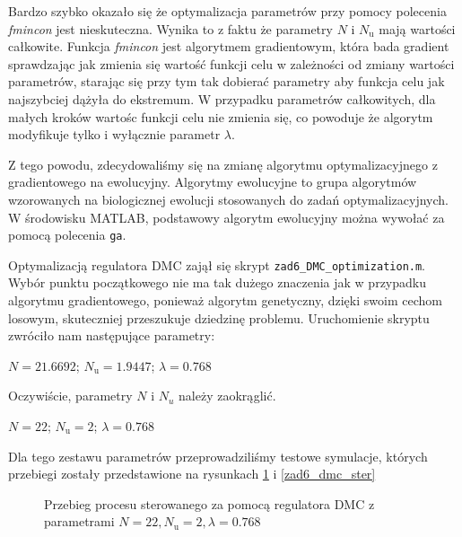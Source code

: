 Bardzo szybko okazało się że optymalizacja parametrów przy pomocy
polecenia \emph{fmincon} jest nieskuteczna. Wynika to z faktu że parametry $N$ i $N_{\mathrm{u}}$ mają
wartości całkowite. Funkcja \emph{fmincon} jest algorytmem gradientowym, która bada gradient sprawdzając
jak zmienia się wartość funkcji celu w zależności od zmiany wartości parametrów, starając się przy tym 
tak dobierać parametry aby funkcja celu jak najszybciej dążyła do ekstremum. W przypadku parametrów całkowitych,
dla małych kroków wartośc funkcji celu nie zmienia się, co powoduje że algorytm modyfikuje tylko i wyłącznie 
parametr $\lambda$.

Z tego powodu, zdecydowaliśmy się na zmianę algorytmu optymalizacyjnego z gradientowego
na ewolucyjny. Algorytmy ewolucyjne to grupa algorytmów wzorowanych na biologicznej
ewolucji stosowanych do zadań optymalizacyjnych. W środowisku MATLAB, podstawowy algorytm 
ewolucyjny można wywołać za pomocą polecenia \verb+ga+. 

Optymalizacją regulatora DMC zajął się skrypt \verb+zad6_DMC_optimization.m+. Wybór punktu początkowego nie
ma tak dużego znaczenia jak w przypadku algorytmu gradientowego, ponieważ algorytm genetyczny, dzięki swoim
cechom losowym, skuteczniej przeszukuje dziedzinę problemu. 
Uruchomienie skryptu zwróciło nam następujące parametry:

\begin{center}
    $N = \num{21.6692}$;
    $N_{\mathrm{u}} = \num{1.9447}$;
    $\lambda = \num{0.768}$
\end{center}

Oczywiście, parametry $N$ i $N_{u}$ należy zaokrąglić.
\begin{center}
    $N = \num{22}$;
    $N_{\mathrm{u}} = \num{2}$;
    $\lambda = \num{0.768}$
\end{center}

Dla tego zestawu parametrów przeprowadziliśmy testowe symulacje, których 
przebiegi zostały przedstawione na rysunkach \ref{zad6_dmc_wyjscie} i \ref{zad6_dmc_ster}

\begin{figure}[t]
    \centering
    \caption{Przebieg procesu sterowanego za pomocą regulatora DMC z parametrami \mbox{$N = \num{22}, N_{\mathrm{u}} = \num{2}, \lambda = \num{0.768}$}}
    \label{zad6_dmc_wyjscie}
\end{figure}

